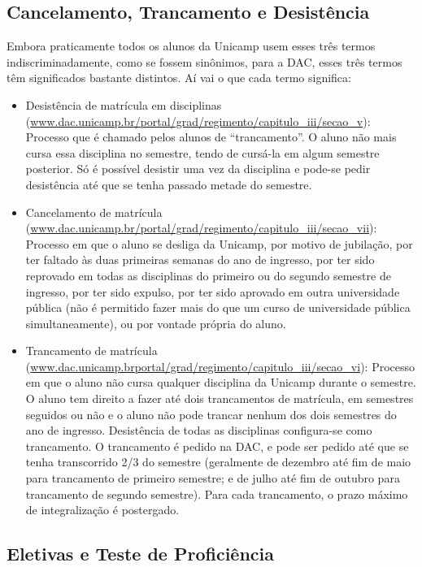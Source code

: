 \subsection{Cancelamento, Trancamento e Desistência}

Embora praticamente todos os alunos da Unicamp usem esses três termos
indiscriminadamente, como se fossem sinônimos, para a DAC, esses três termos têm
significados bastante distintos. Aí vai o que cada termo significa:

\begin{itemize}
\item Desistência de matrícula em disciplinas
      (\url{www.dac.unicamp.br/portal/grad/regimento/capitulo_iii/secao_v}):
      Processo que é chamado pelos alunos de ``trancamento''.
      O aluno não mais cursa essa disciplina no semestre,
      tendo de cursá-la em algum semestre posterior. Só é possível desistir uma vez da
      disciplina e pode-se pedir desistência até que se tenha passado metade do
      semestre.
\item Cancelamento de matrícula
      (\url{www.dac.unicamp.br/portal/grad/regimento/capitulo_iii/secao_vii}):
      Processo em que o aluno se desliga da Unicamp, por motivo de jubilação, por
      ter faltado às duas primeiras semanas do ano de ingresso, por ter sido
      reprovado em todas as disciplinas do primeiro ou do segundo semestre de
      ingresso, por ter sido expulso, por ter sido aprovado em outra universidade
      pública (não é permitido fazer mais do que um curso de universidade pública
      simultaneamente), ou por vontade própria do aluno.
\item Trancamento de matrícula
      (\url{www.dac.unicamp.brportal/grad/regimento/capitulo_iii/secao_vi}):
      Processo em que o aluno não cursa qualquer disciplina da Unicamp durante
      o semestre. O aluno tem direito a fazer até dois trancamentos de matrícula, em
      semestres seguidos ou não e o aluno não pode trancar nenhum dos dois
      semestres do ano de ingresso. Desistência de todas as disciplinas
      configura-se como trancamento. O trancamento é pedido na DAC, e pode ser
      pedido até que se tenha transcorrido 2/3 do semestre (geralmente de dezembro
      até fim de maio para trancamento de primeiro semestre; e de julho até fim de
      outubro para trancamento de segundo semestre). Para cada trancamento,
      o prazo máximo de integralização é postergado.
\end{itemize}

\subsection{Eletivas e Teste de Proficiência}

